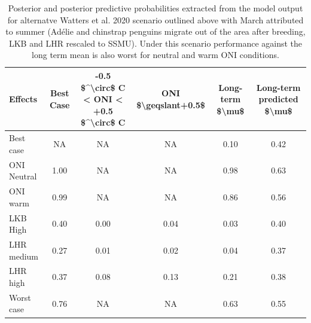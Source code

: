\documentclass[]{elsarticle} %
\begin{document}
\begin{landscape}

\begin{longtable}[t]{lccccc}
\caption{\label{tab:Table 1 Scenario 37b}Posterior and posterior predictive probabilities extracted from the model output for alternatve Watters et al. 2020 scenario outlined above with March attributed to summer (Adélie and chinstrap penguins migrate out of the area after breeding, LKB and LHR rescaled to SSMU). Under this scenario performance against the long term mean is also worst for neutral and warm ONI conditions.}\\
\toprule
Effects & Best Case & -0.5 \$\textasciicircum{}\textbackslash{}circ\$ C < ONI < +0.5 \$\textasciicircum{}\textbackslash{}circ\$ C & ONI \$\textbackslash{}geqslant+0.5\$ & Long-term \$\textbackslash{}mu\$ & Long-term predicted \$\textbackslash{}mu\$\\
\midrule
Best case & NA & NA & NA & 0.10 & 0.42\\
ONI Neutral & 1.00 & NA & NA & 0.98 & 0.63\\
ONI warm & 0.99 & NA & NA & 0.86 & 0.56\\
LKB High & 0.40 & 0.00 & 0.04 & 0.03 & 0.40\\
LHR medium & 0.27 & 0.01 & 0.02 & 0.04 & 0.37\\
\addlinespace
LHR high & 0.37 & 0.08 & 0.13 & 0.21 & 0.38\\
Worst case & 0.76 & NA & NA & 0.63 & 0.55\\
\bottomrule
\end{longtable}

\end{landscape}
\begin{landscape}

\end{landscape}
\begin{landscape}

\end{landscape}
\end{document}
